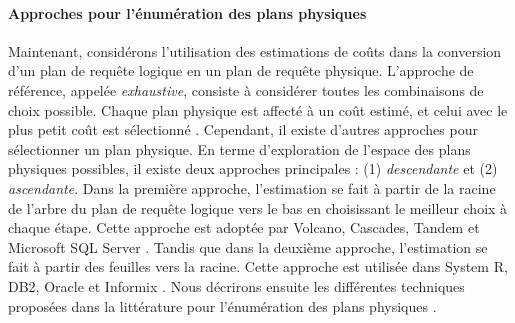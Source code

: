 \paragraph{Approches pour l'énumération des plans physiques} %
Maintenant, considérons l'utilisation des estimations de coûts dans la conversion d'un plan de requête logique en un plan de requête physique. L'approche de référence, appelée \textit{exhaustive}, consiste à considérer toutes les combinaisons de choix possible. Chaque plan physique est affecté à un coût estimé, et celui avec le plus petit coût est sélectionné \cite{Elmasri08}. Cependant, il existe d'autres approches pour sélectionner un plan physique. En terme d'exploration de l'espace des plans physiques possibles, il existe deux approches principales : (1) \textit{descendante} et (2) \textit{ascendante}. Dans la première approche, l'estimation se fait à partir de la racine de l'arbre du plan de requête logique vers le bas en choisissant le meilleur choix à chaque étape. Cette approche est adoptée par Volcano, Cascades, Tandem et Microsoft SQL Server \cite{Lohman07}. Tandis que dans la deuxième approche, l'estimation se fait à partir des feuilles vers la racine. Cette approche est utilisée dans System R, DB2, Oracle et Informix \cite{Lohman07}. Nous décrirons ensuite les différentes techniques proposées dans la littérature pour l'énumération des plans physiques \cite{GarciaMolina08, Elmasri08}.

